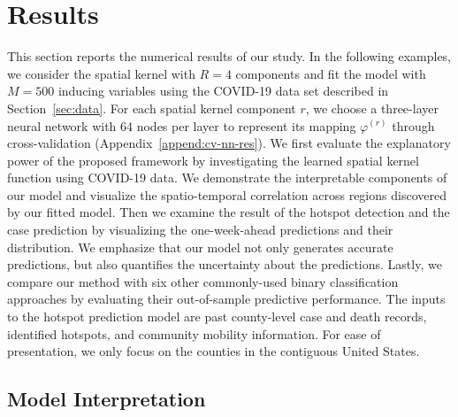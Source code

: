 \documentclass[journal]{IEEEtran}
\begin{document}
\section{Results}
\label{sec:results}

This section reports the numerical results of our study. 
In the following examples, we consider the spatial kernel with $R=4$ components and fit the model with $M=500$ inducing variables using the COVID-19 data set described in Section~\ref{sec:data}. 
For each spatial kernel component $r$, 
we choose a three-layer neural network with 64 nodes per layer to represent its mapping $\varphi^{(r)}$ through cross-validation (Appendix~\ref{append:cv-nn-res}).
We first evaluate the explanatory power of the proposed framework by investigating the learned spatial kernel function using COVID-19 data. 
We demonstrate the interpretable components of our model and visualize the spatio-temporal correlation across regions discovered by our fitted model.
Then we examine the result of the hotspot detection and the case prediction by visualizing the one-week-ahead predictions and their distribution.
We emphasize that our model not only generates accurate predictions, but also quantifies the uncertainty about the predictions.
Lastly, we compare our method with six other commonly-used binary classification approaches by evaluating their out-of-sample predictive performance. 
The inputs to the hotspot prediction model are past county-level case and death records, identified hotspots, and community mobility information. 
For ease of presentation, we only focus on the counties in the contiguous United States. 

\subsection{Model Interpretation}
\end{document}
